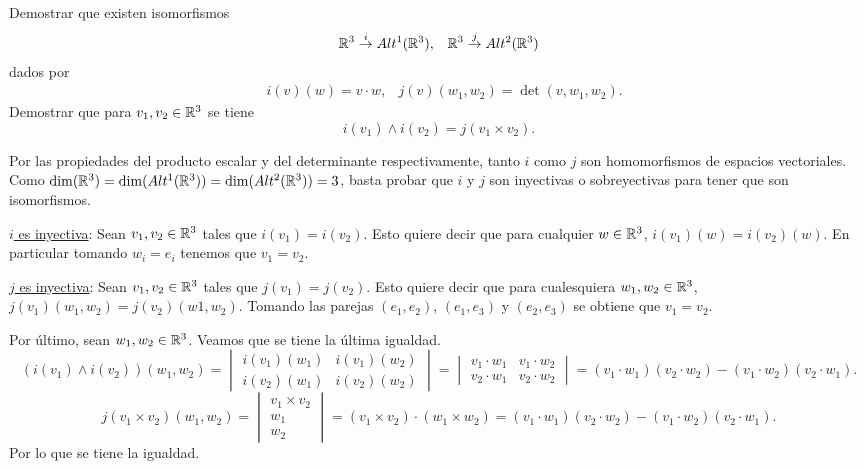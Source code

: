 \documentclass[twoside]{article}
\begin{document}
\begin{ejercicio}{2.3}
Demostrar que existen isomorfismos
\begin{align*}
&\mathbb{R}^3\overset{i}{\to} Alt^1(\mathbb{R}^3), &\mathbb{R}^3\overset{j}{\to} Alt^2(\mathbb{R}^3)
\end{align*}
dados por
\begin{align*}
& i(v)(w)=v\cdot w, & j(v)(w_1,w_2)=\det(v,w_1,w_2).
\end{align*}
Demostrar que para $v_1,v_2\in\mathbb{R}^3$ se tiene
$$i(v_1)\land i(v_2)=j(v_1\times v_2).$$
\end{ejercicio}
\begin{solucion}
Por las propiedades del producto escalar y del determinante respectivamente, tanto $i$ como $j$ son homomorfismos de espacios vectoriales. Como $\dim(\mathbb{R}^3)=\dim(Alt^1(\mathbb{R}^3))=\dim(Alt^2(\mathbb{R}^3))=3$, basta probar que $i$ y $j$ son inyectivas o sobreyectivas para tener que son isomorfismos.

\underline{$i$ es inyectiva}:
Sean $v_1,v_2\in\mathbb{R}^3$ tales que $i(v_1)=i(v_2)$. Esto quiere decir que para cualquier $w\in\mathbb{R}^3$, $i(v_1)(w)=i(v_2)(w)$. En particular tomando $w_i=e_i$ tenemos que $v_1=v_2$. 


\underline{$j$ es inyectiva}:
Sean $v_1,v_2\in\mathbb{R}^3$ tales que $j(v_1)=j(v_2)$. Esto quiere decir que para cualesquiera $w_1,w_2\in\mathbb{R}^3$, $j(v_1)(w_1,w_2)=j(v_2)(w1,w_2)$. Tomando las parejas $(e_1,e_2)$, $(e_1,e_3)$ y $(e_2,e_3)$ se obtiene que $v_1=v_2$. 

Por último, sean $w_1,w_2\in\mathbb{R}^3$. Veamos que se tiene la última igualdad.
$$(i(v_1)\land i(v_2))(w_1,w_2)=\begin{vmatrix}
i(v_1)(w_1) & i(v_1)(w_2)\\
i(v_2)(w_1) & i(v_2)(w_2)
\end{vmatrix}=\begin{vmatrix}
v_1\cdot w_1 & v_1\cdot w_2\\
v_2\cdot w_1 & v_2\cdot w_2
\end{vmatrix}=(v_1\cdot w_1)(v_2\cdot w_2)-(v_1\cdot w_2)(v_2\cdot w_1).$$
$$j(v_1\times v_2)(w_1,w_2)=\begin{vmatrix}
v_1\times v_2\\
w_1\\
w_2
\end{vmatrix}=(v_1\times v_2)\cdot (w_1\times w_2)=(v_1\cdot w_1)(v_2\cdot w_2)-(v_1\cdot w_2)(v_2\cdot w_1).$$
Por lo que se tiene la igualdad. 
\end{solucion}

\newpage
\end{document}
